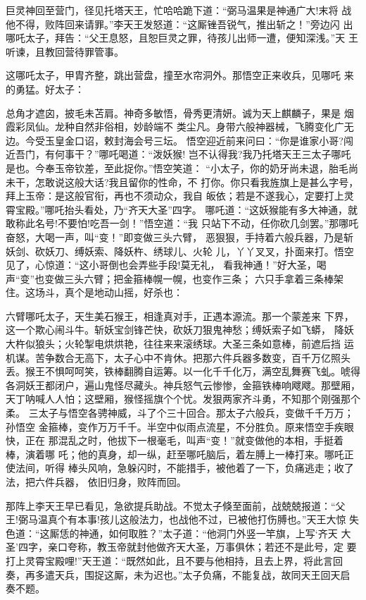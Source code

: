 巨灵神回至营门，径见托塔天王，忙哈哈跪下道：“弼马温果是神通广大!末将
战他不得，败阵回来请罪。”李天王发怒道：“这厮锉吾锐气，推出斩之！”旁边闪
出哪吒太子，拜告：“父王息怒，且恕巨灵之罪，待孩儿出师一遭，便知深浅。”天
王听谏，且教回营待罪管事。

这哪吒太子，甲胄齐整，跳出营盘，撞至水帘洞外。那悟空正来收兵，见哪吒
来的勇猛。好太子：

总角才遮囟，披毛未苫肩。神奇多敏悟，骨秀更清妍。诚为天上麒麟子，果是
烟霞彩凤仙。龙种自然非俗相，妙龄端不
类尘凡。身带六般神器械，飞腾变化广无边。今受玉皇金口诏，敕封海会号三坛。
悟空迎近前来问曰：“你是谁家小哥?闯近吾门，有何事干？”哪吒喝道：“泼妖猴!
岂不认得我?我乃托塔天王三太子哪吒是也。今奉玉帝钦差，至此捉你。”悟空笑道：
“小太子，你的奶牙尚未退，胎毛尚未干，怎敢说这般大话?我且留你的性命，不
打你。你只看我旌旗上是甚么字号，拜上玉帝：是这般官衔，再也不须动众，我自
皈依；若是不遂我心，定要打上灵霄宝殿。”哪吒抬头看处，乃“齐天大圣”四字。
哪吒道：“这妖猴能有多大神通，就敢称此名号!不要怕!吃吾一剑！”悟空道：“我
只站下不动，任你砍几剑罢。”那哪吒奋怒，大喝一声，叫“变！”即变做三头六臂，
恶狠狠，手持着六般兵器，乃是斩妖剑、砍妖刀、缚妖索、降妖杵、绣球儿、火轮
儿，丫丫叉叉，扑面来打。悟空见了，心惊道：“这小哥倒也会弄些手段!莫无礼，
看我神通！”好大圣，喝声“变”也变做三头六臂；把金箍棒幌一幌，也变作三条；
六只手拿着三条棒架住。这场斗，真个是地动山摇，好杀也：

六臂哪吒太子，天生美石猴王，相逢真对手，正遇本源流。那一个蒙差来
下界，这一个欺心闹斗牛。斩妖宝剑锋芒快，砍妖刀狠鬼神愁；缚妖索子如飞蟒，
降妖大杵似狼头；火轮掣电烘烘艳，往往来来滚绣球。大圣三条如意棒，前遮后挡
运机谋。苦争数合无高下，太子心中不肯休。把那六件兵器多数变，百千万亿照头
丢。猴王不惧呵呵笑，铁棒翻腾自运筹。以一化千千化万，满空乱舞赛飞虬。唬得
各洞妖王都闭户，遍山鬼怪尽藏头。神兵怒气云惨惨，金箍铁棒响飕飕。那壁厢，
天丁呐喊人人怕；这壁厢，猴怪摇旗个个忧。发狠两家齐斗勇，不知那个刚强那个
柔。
三太子与悟空各骋神威，斗了个三十回合。那太子六般兵，变做千千万万；孙悟空
金箍棒，变作万万千千。半空中似雨点流星，不分胜负。原来悟空手疾眼快，正在
那混乱之时，他拔下一根毫毛，叫声“变！”就变做他的本相，手挺着棒，演着哪
吒；他的真身，却一纵，赶至哪吒脑后，着左膊上一棒打来。哪吒正使法间，听得
棒头风响，急躲闪时，不能措手，被他着了一下，负痛逃走；收了法，把六件兵器，
依旧归身，败阵而回。

那阵上李天王早已看见，急欲提兵助战。不觉太子倏至面前，战兢兢报道：“父
王!弼马温真个有本事!孩儿这般法力，也战他不过，已被他打伤膊也。”天王大惊
失色道：“这厮恁的神通，如何取胜？”太子道：“他洞门外竖一竿旗，上写‘齐天
大圣’四字，亲口夸称，教玉帝就封他做齐天大圣，万事俱休；若还不是此号，定
要打上灵霄宝殿哩!”天王道：“既然如此，且不要与他相持，且去上界，将此言回
奏，再多遣天兵，围捉这厮，未为迟也。”太子负痛，不能复战，故同天王回天启
奏不题。

